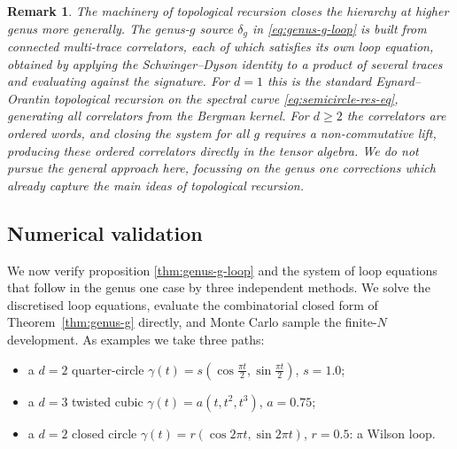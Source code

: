 \documentclass[11pt,a4paper]{article}
\newtheorem{remark}[theorem]{Remark}
\begin{document}
\begin{remark}\label{rem:W2-closed}
The machinery of topological recursion closes the hierarchy at higher genus more generally. The genus-$g$ source $\delta_g$ in \eqref{eq:genus-g-loop} is built from connected multi-trace correlators, each of which satisfies its own loop equation, obtained by applying the Schwinger--Dyson identity to a product of several traces and evaluating against the signature. For $d=1$ this is the standard Eynard--Orantin topological recursion \cite{eynard2007invariants,eynard2016counting} on the spectral curve \eqref{eq:semicircle-res-eq}, generating all correlators from the Bergman kernel. For $d\geq2$ the correlators are ordered words, and closing the system for all $g$ requires a non-commutative lift, producing these ordered correlators directly in the tensor algebra. We do not pursue the general approach here, focussing on the genus one corrections which already capture the main ideas of topological recursion.
\end{remark}



\subsection{Numerical validation}\label{sec:numerics}

We now verify proposition \ref{thm:genus-g-loop} and the system of loop equations that follow in the genus one case by three independent methods. We solve the discretised loop equations, evaluate the combinatorial closed form of Theorem~\ref{thm:genus-g} directly, and Monte Carlo sample the finite-$N$ development. As examples we take three paths:
\begin{itemize}
\item a $d=2$ quarter-circle $\gamma(t)=s(\cos\tfrac{\pi t}{2},\sin\tfrac{\pi t}{2})$, $s=1.0$;
\item a $d=3$ twisted cubic $\gamma(t)=a(t,t^2,t^3)$, $a=0.75$;
\item a $d=2$ closed circle $\gamma(t)=r(\cos 2\pi t,\sin 2\pi t)$, $r=0.5$: a Wilson loop.
\end{itemize}
\end{document}
